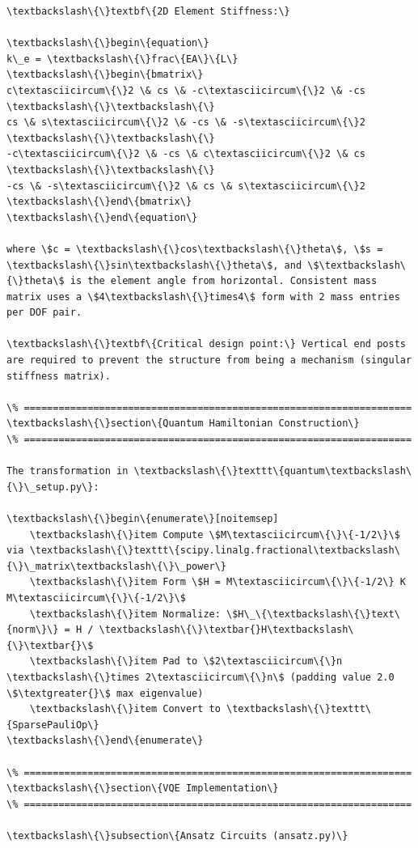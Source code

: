 \documentclass[12pt, a4paper]{article}
\begin{document}
\begin{lstlisting}[style=codestyle, caption={VQA\_Modal\_Analysis\_Report.tex}]
\textbackslash\{\}textbf\{2D Element Stiffness:\}

\textbackslash\{\}begin\{equation\}
k\_e = \textbackslash\{\}frac\{EA\}\{L\}
\textbackslash\{\}begin\{bmatrix\}
c\textasciicircum\{\}2 \& cs \& -c\textasciicircum\{\}2 \& -cs \textbackslash\{\}\textbackslash\{\}
cs \& s\textasciicircum\{\}2 \& -cs \& -s\textasciicircum\{\}2 \textbackslash\{\}\textbackslash\{\}
-c\textasciicircum\{\}2 \& -cs \& c\textasciicircum\{\}2 \& cs \textbackslash\{\}\textbackslash\{\}
-cs \& -s\textasciicircum\{\}2 \& cs \& s\textasciicircum\{\}2
\textbackslash\{\}end\{bmatrix\}
\textbackslash\{\}end\{equation\}

where \$c = \textbackslash\{\}cos\textbackslash\{\}theta\$, \$s = \textbackslash\{\}sin\textbackslash\{\}theta\$, and \$\textbackslash\{\}theta\$ is the element angle from horizontal. Consistent mass matrix uses a \$4\textbackslash\{\}times4\$ form with 2 mass entries per DOF pair.

\textbackslash\{\}textbf\{Critical design point:\} Vertical end posts are required to prevent the structure from being a mechanism (singular stiffness matrix).

\% ===================================================================
\textbackslash\{\}section\{Quantum Hamiltonian Construction\}
\% ===================================================================

The transformation in \textbackslash\{\}texttt\{quantum\textbackslash\{\}\_setup.py\}:

\textbackslash\{\}begin\{enumerate\}[noitemsep]
    \textbackslash\{\}item Compute \$M\textasciicircum\{\}\{-1/2\}\$ via \textbackslash\{\}texttt\{scipy.linalg.fractional\textbackslash\{\}\_matrix\textbackslash\{\}\_power\}
    \textbackslash\{\}item Form \$H = M\textasciicircum\{\}\{-1/2\} K M\textasciicircum\{\}\{-1/2\}\$
    \textbackslash\{\}item Normalize: \$H\_\{\textbackslash\{\}text\{norm\}\} = H / \textbackslash\{\}\textbar{}H\textbackslash\{\}\textbar{}\$
    \textbackslash\{\}item Pad to \$2\textasciicircum\{\}n \textbackslash\{\}times 2\textasciicircum\{\}n\$ (padding value 2.0 \$\textgreater{}\$ max eigenvalue)
    \textbackslash\{\}item Convert to \textbackslash\{\}texttt\{SparsePauliOp\}
\textbackslash\{\}end\{enumerate\}

\% ===================================================================
\textbackslash\{\}section\{VQE Implementation\}
\% ===================================================================

\textbackslash\{\}subsection\{Ansatz Circuits (ansatz.py)\}


\end{lstlisting}
\end{document}
